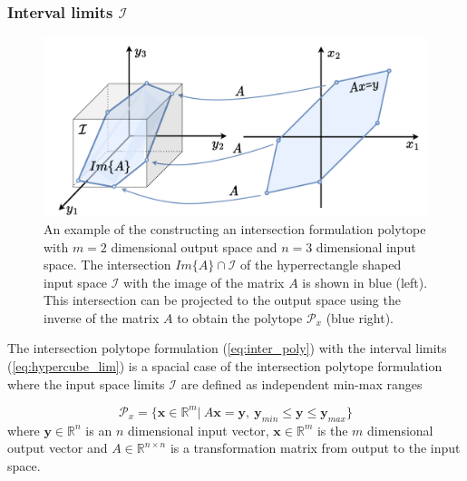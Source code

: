 \subsubsection{Interval limits $\mathcal{I}$}
\label{ch:inter_inter_chapter}
\begin{figure}[!htb]
    \centering
    \includegraphics[width=0.7\linewidth]{Chapters/imgs/intersection.pdf}
    \caption{An example of the constructing an intersection formulation polytope with $m=2$ dimensional output space and $n=3$ dimensional input space. The intersection $Im\{A\} \cap \mathcal{I}$ of the hyperrectangle shaped input space $\mathcal{I}$ with the image of the matrix $A$ is shown in blue (left). This intersection can be projected to the output space using the inverse of the matrix $A$ to obtain the polytope $\mathcal{P}_x$ (blue right).}
    \label{fig:inter}
\end{figure}

The intersection polytope formulation (\ref{eq:inter_poly}) with the interval limits (\ref{eq:hypercube_lim}) is a spacial case of the intersection polytope formulation where the input space limits $\mathcal{I}$ are defined as independent min-max ranges 

\begin{equation}
    \mathcal{P}_x=\{\bm{x}\in\mathbb{R}^m |~ A\bm{x} = \bm{y},~\bm{y}_{min} \leq  \bm{y} \leq \bm{y}_{max}  \}
    \label{eq:inter_hyp}
\end{equation}
where $\bm{y}\in\mathbb{R}^n$ is an $n$ dimensional input vector, $\bm{x}\in\mathbb{R}^m$ is the $m$ dimensional output vector and $A\in\mathbb{R}^{n\times n}$ is a transformation matrix from output to the input space.

